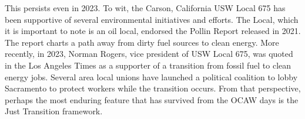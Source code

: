 \documentclass[12pt]{article}
\begin{document}
This persists even in 2023. To wit, the Carson, California USW Local 675 has been supportive of several environmental initiatives and efforts. The Local, which it is important to note is an oil local, endorsed the Pollin Report released in 2021. The report charts a path away from dirty fuel sources to clean energy. More recently, in 2023, Norman Rogers, vice president of USW Local 675, was quoted in the Los Angeles Times as a supporter of a transition from fossil fuel to clean energy jobs. Several area local unions have launched a political coalition to lobby Sacramento to protect workers while the transition occurs. From that perspective, perhaps the most enduring feature that has survived from the OCAW days is the Just Transition framework.



\end{document}

